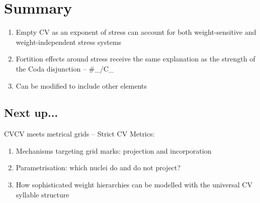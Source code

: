 \documentclass[a4paper, 12pt]{article}
\begin{document}
		\section{Summary}
		
	\begin{enumerate}[$\gg$]
		\item Empty CV as an exponent of stress can account for both weight-sensitive and weight-independent stress systems
		\item Fortition effects around stress receive the same explanation as the strength of the Coda disjunction -- {\#\_/C\_}
		\item Can be modified to include other elements
	\end{enumerate}
	
			\subsection{Next up...}
			
	CVCV meets metrical grids -- Strict CV Metrics:
	
	\begin{enumerate}[$\gg$]
		\item Mechanisms targeting grid marks: projection and incorporation
		\item Parametrisation: which nuclei do and do not project?
		\item How sophisticated weight hierarchies can be modelled with the universal CV syllable structure
	\end{enumerate}
		
\printbibliography
\end{document}

